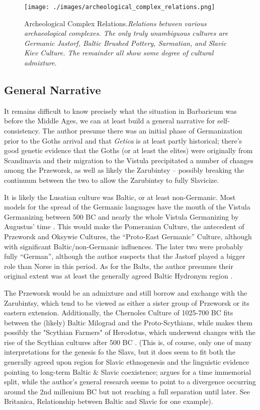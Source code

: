 \documentclass{article}
\begin{document}
	\begin{figure}[h]
		\centering
		\texttt{[image: ./images/archeological\_complex\_relations.png]}
		\caption{Archeological Complex Relations.\newline \small \textit{Relations between various archaeological complexes.
				The only truly unambiguous cultures are Germanic Jastorf, Baltic Brushed Pottery, Sarmatian, and Slavic Kiev Culture.
				The remainder all show some degree of cultural admixture.}}
	\end{figure}
	
	\subsection{General Narrative}
	It remains difficult to know precisely what the situation in Barbaricum was before the Middle Ages, we can at least build a general narrative for self-consistency.
	The author presume there was an initial phase of Germanization prior to the Goths arrival and that \textit{Getica} is at least partly historical; there’s good genetic evidence that the Goths (or at least the elites) were originally from Scandinavia and their migration to the Vistula precipitated a number of changes among the Przeworsk, as well as likely the Zarubintsy – possibly breaking the continuum between the two to allow the Zarubintsy to fully Slavicize.
	
	It is likely the Lusatian culture was Baltic, or at least non-Germanic.
	Most models for the spread of the Germanic languages have the mouth of the Vistula Germanizing between 500 BC and nearly the whole Vistula Germanizing by Augustus’ time \cite{HeatherEmpiresAndBarbarians}.
	This would make the Pomeranian Culture, the antecedent of Przeworsk and Oksywie Cultures, the “Proto-East Germanic” Culture, although with significant Baltic/non-Germanic influences.
	The later two were probably fully “German”, although the author suspects that the Jastorf played a bigger role than Norse in this period.
	As for the Balts, the author presumes their original extent was at least the generally agreed Baltic Hydronym region \cite{HeatherEmpiresAndBarbarians,BalticHydronyms}.
	
	The Przeworsk would be an admixture and still borrow and exchange with the Zarubintsy, which tend to be viewed as either a sister group of Przeworsk or its eastern extension.
	Additionally, the Chernoles Culture of 1025-700 BC fits between the (likely) Baltic Milograd and the Proto-Scythians, while makes them possibly the "Scythian Farmers" of Herodotus, which underwent changes with the rise of the Scythian cultures after 500 BC \cite{IndoEuroEncyclopedia}.
	(This is, of course, only one of many interpretations for the genesis fo the Slavs, but it does seem to fit both the generally agreed upon region for Slavic ethnogenesis \cite{HeatherEmpiresAndBarbarians} and the linguistic evidence pointing to long-term Baltic \& Slavic coexistence; \cite{SlavicLanguages} argues for a time immemorial split, while the author's general research seems to point to a divergence occurring around the 2nd millenium BC but not reaching a full separation until later. See Britanica, Relationship between Baltic and Slavic for one example).
	
\end{document}
